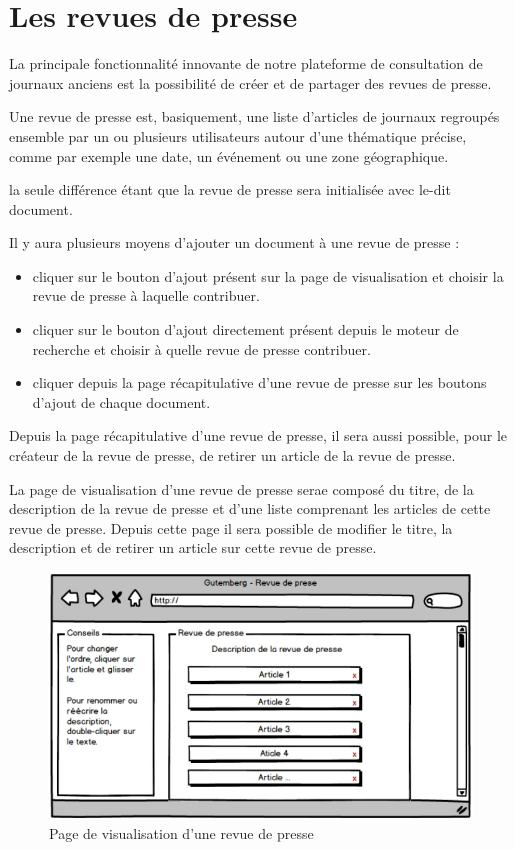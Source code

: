 \section{Les revues de presse}
\label{sec:revue}

La principale fonctionnalité innovante de notre plateforme de consultation de journaux anciens est la possibilité de
créer et de partager des revues de presse.

Une revue de presse est, basiquement, une liste d'articles de journaux regroupés ensemble par un ou plusieurs utilisateurs autour d'une thématique précise,
comme par exemple une date, un événement ou une zone géographique.

la seule différence étant que la revue de presse sera initialisée avec le-dit document.

Il y aura plusieurs moyens d'ajouter un document à une revue de presse :

\begin{itemize}
  \item cliquer sur le bouton d'ajout présent sur la page de visualisation et choisir la
revue de presse à laquelle contribuer.
  \item cliquer sur le bouton d'ajout directement présent depuis le moteur de recherche et choisir
à quelle revue de presse contribuer.
  \item cliquer depuis la page récapitulative d'une revue de presse sur les boutons d'ajout de chaque document.
\end{itemize}
Depuis la page récapitulative d'une revue de presse, il sera aussi possible, pour le créateur de la revue de presse, de retirer un article de
la revue de presse.

La page de visualisation d'une revue de presse serae composé du titre, de la description de la revue de presse et d'une liste comprenant les articles
de cette revue de presse. Depuis cette page il sera possible de modifier le titre, la description et de retirer un article sur cette revue de presse.

\begin{figure}[H]
    \centering
    \includegraphics[width=\textwidth]{figures/revue.png}
    \caption{Page de visualisation d'une revue de presse}
    \label{fig:revue}
\end{figure}

